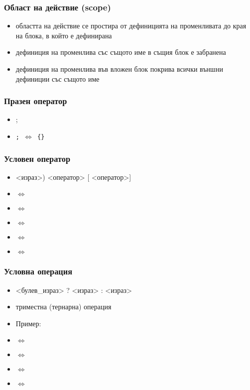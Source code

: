 \documentclass{beamer}
\begin{document}
\begin{frame}
  \frametitle{Област на действие (scope)}
  
  \begin{itemize}[<+->]
  \item областта на действие се простира от дефиницията на
    променливата до края на блока, в който е дефинирана
  \item дефиниция на променлива със същото име в същия блок е
    забранена
  \item дефиниция на променлива във вложен блок покрива всички външни
    дефиниции със същото име
  \end{itemize}
\end{frame}

\begin{frame}
  \frametitle{Празен оператор}
  \begin{itemize}
  \item \tta;
  \item \tt; $\Leftrightarrow$ \tt{\{\}}
  \end{itemize}
\end{frame}

\begin{frame}
  \frametitle{Условен оператор}
  
  \begin{itemize}[<+->]
  \item {}<израз>\tta) <оператор> [ <оператор>]
  \item {} $\Leftrightarrow$ 
  \item {} $\Leftrightarrow$ 
  \item {} $\Leftrightarrow$ 
  \item {} $\Leftrightarrow$ 
  \item {} $\Leftrightarrow$ 
  \end{itemize}
\end{frame}

\begin{frame}
  \frametitle{Условна \alert{операция}}
  \begin{itemize}[<+->]
  \item{} <булев\_израз> ? <израз> : <израз>
  \item триместна (тернарна) операция
  \item Пример: 
  \item {} $\Leftrightarrow$ 
  \item {} $\Leftrightarrow$ 
  \item {} $\Leftrightarrow$ 
  \item {} $\Leftrightarrow$ 
  \end{itemize}
\end{frame}
\end{document}
